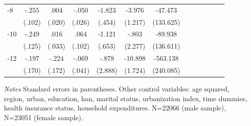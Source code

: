 \begin{table}[h]
\begin{adjustbox}{max width=\linewidth}
\begin{threeparttable}
{\begin{tabular}{l*{6}{SS}}
-8             &    -.255\sym{*}  &     .004         &    -.050         &   -1.823\sym{***}&   -3.976\sym{**} &  -47.473         \\
                &   (.102)         &   (.020)         &   (.026)         &   (.454)         &  (1.217)         &(133.625)         \\
-10            &    -.249\sym{*}  &     .016         &     .064         &   -1.121         &    -.803         &  -89.938         \\
                &   (.125)         &   (.033)         &   (.102)         &   (.653)         &  (2.277)         &(136.611)         \\
-12           &    -.197         &    -.224         &    -.069         &    -.878         &  -10.898\sym{***}& -563.138\sym{*}  \\
                &   (.170)         &   (.172)         &   (.041)         &  (2.888)         &  (1.724)         &(240.085)         \\      
\bottomrule
\end{tabular}
\begin{tablenotes}
\item \textit{Notes}   Standard errors in parentheses.
Other control variables: age squared, region, urban, education, han, marital status, urbanization index, time dummies, health insurance status, household expenditures. N=22066 (male sample), N=23051 (female sample).
\end{tablenotes}
}
\end{threeparttable}
\end{adjustbox}
\end{table}



